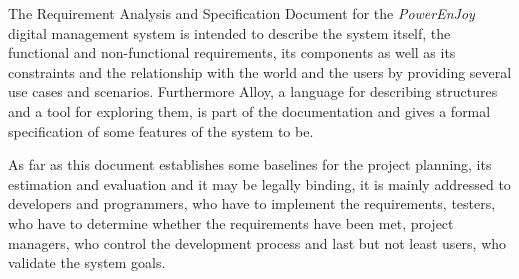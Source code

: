 The Requirement Analysis and Specification Document for the \textit{PowerEnJoy} digital management system is intended to describe the system itself, the functional and non-functional requirements, its components as well as its constraints and the relationship with the world and the users by providing several use cases and scenarios. Furthermore Alloy, a language for describing structures and a tool for exploring them, is part of the documentation and gives a formal specification of some features of the system to be.

As far as this document establishes some baselines for the project planning, its estimation and evaluation and it may be legally binding, it is mainly addressed to developers and programmers, who have to implement the requirements, testers, who have to determine whether the requirements have been met, project managers, who control the development process and last but not least users, who validate the system goals.